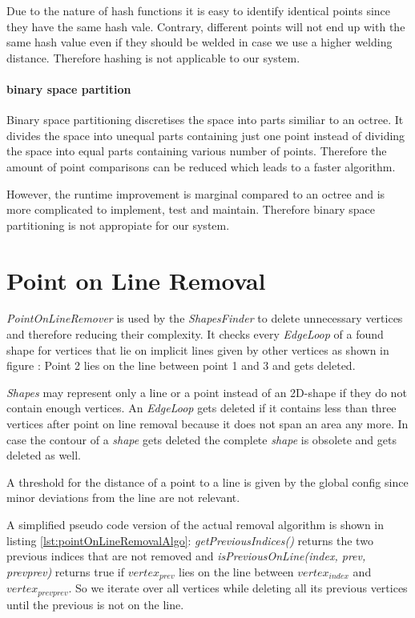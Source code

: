 \documentclass[../ClassicThesis.tex]{subfiles}
\begin{document}
Due to the nature of hash functions it is easy to identify identical points since they have the same hash vale. Contrary, different points will not end up with the same hash value even if they should be welded in case we use a higher welding distance. Therefore hashing is not applicable to our system.

\paragraph{binary space partition}

Binary space partitioning discretises the space into parts similiar to an octree. It divides the space into unequal parts containing just one point instead of dividing the space into equal parts containing various number of points. Therefore the amount of point comparisons can be reduced which leads to a faster algorithm.

However, the runtime improvement is marginal compared to an octree and is more complicated to implement, test and maintain. Therefore binary space partitioning is not appropiate for our system.





\section{Point on Line Removal}

\emph{PointOnLineRemover} is used by the \emph{ShapesFinder} to delete unnecessary vertices and therefore reducing their complexity. It checks every \emph{EdgeLoop} of a found shape for vertices that lie on implicit lines given by other vertices as shown in figure : Point 2 lies on the line between point 1 and 3 and gets deleted.


\emph{Shapes} may represent only a line or a point instead of an 2D-shape if they do not contain enough vertices. An \emph{EdgeLoop} gets deleted if it contains less than three vertices after point on line removal because it does not span an area any more. In case the contour of a \emph{shape} gets deleted the complete \emph{shape} is obsolete and gets deleted as well.

A threshold for the distance of a point to a line is given by the global config since minor deviations from the line are not relevant.

A simplified pseudo code version of the actual removal algorithm is shown in listing \ref{lst:pointOnLineRemovalAlgo}: \emph{getPreviousIndices()} returns the two previous indices that are not removed and \emph{isPreviousOnLine(index, prev, prevprev)} returns true if $ vertex_{prev}$ lies on the line between $vertex_{index}$ and $vertex_{prevprev}$. So we iterate over all vertices while deleting all its previous vertices until the previous is not on the line.
\end{document}
